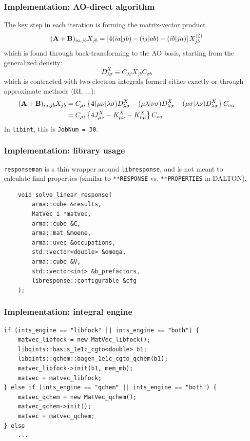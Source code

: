 \documentclass[xcolor=usenames,dvipsnames,svgnames]{beamer}
\begin{document}
\begin{frame}
  \frametitle{Implementation: AO-direct algorithm}
  \scriptsize
  The key step in each iteration is forming the matrix-vector product
  \begin{equation*}
    (\boldsymbol{\mathbf{A}}+\boldsymbol{\mathbf{B}})_{ia,jb}X_{jb} = \left[4(ia|jb) - (ij|ab) - (ib|ja)\right] X_{jb}^{(\zeta)}
  \end{equation*}
  which is found through back-transforming to the AO basis, starting from the generalized density:
  \begin{equation*}
    D_{\lambda\sigma}^{X} \equiv C_{\lambda j} X_{jb} C_{\sigma b}
  \end{equation*}
  which is contracted with two-electron integrals formed either exactly or through approximate methods (RI, ...):
  \begin{align*}
    (\boldsymbol{\mathbf{A}}+\boldsymbol{\mathbf{B}})_{ia,jb}X_{jb} &= C_{\mu i} \left\{ 4(\mu\nu|\lambda\sigma)D_{\lambda\sigma}^{X} - (\mu\lambda|\nu\sigma)D_{\lambda\sigma}^{X} - (\mu\sigma|\lambda\nu)D_{\lambda\sigma}^{X} \right\} C_{\nu a} \\
    &= C_{\mu i} \left\{ 4J_{\mu\nu}^{X} - K_{\mu\nu}^{X} - K_{\nu\mu}^{X} \right\} C_{\nu a}
  \end{align*}
  In \texttt{libint}, this is \texttt{JobNum = 30}.
\end{frame}

\begin{frame}[fragile]
  \frametitle{Implementation: library usage}
  \texttt{responseman} is a thin wrapper around \texttt{libresponse}, and is not meant to calculate final properties (similar to \texttt{**RESPONSE} vs. \texttt{**PROPERTIES} in DALTON). \\
  \begin{verbatim}
    void solve_linear_response(
        arma::cube &results,
        MatVec_i *matvec,
        arma::cube &C,
        arma::mat &moene,
        arma::uvec &occupations,
        std::vector<double> &omega,
        arma::cube &V,
        std::vector<int> &b_prefactors,
        libresponse::configurable &cfg
    );
  \end{verbatim}
\end{frame}

\begin{frame}[fragile]
  \frametitle{Implementation: integral engine}
  \scriptsize
  \begin{verbatim}
if (ints_engine == "libfock" || ints_engine == "both") {
    matvec_libfock = new MatVec_libfock();
    libqints::basis_1e1c_cgto<double> b1;
    libqints::qchem::bagen_1e1c_cgto_qchem(b1);
    matvec_libfock->init(b1, mem_mb);
    matvec = matvec_libfock;
} else if (ints_engine == "qchem" || ints_engine == "both") {
    matvec_qchem = new MatVec_qchem();
    matvec_qchem->init();
    matvec = matvec_qchem;
} else
    ...
  \end{verbatim}
\end{frame}
\end{document}
